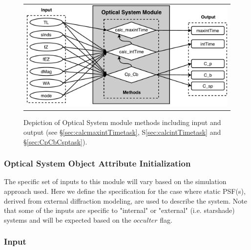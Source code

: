 \documentclass[cleanfoot]{asme2ej}
\begin{document}
\begin{figure}[ht]
    \begin{center}
        \begin{tabular}{c}
            \includegraphics[width=\textwidth]{OpticalSystem}
        \end{tabular}
    \end{center}
    \caption{\label{fig:opticalsysmodule} Depiction of Optical System module methods including input and output (see \S\ref{sec:calcmaxintTimetask}, S\ref{sec:calcintTimetask} and \S\ref{sec:CpCbCsptask}).}
\end{figure}

\label{sec:opticalsystem}
\subsubsection{Optical System Object Attribute Initialization} 

The specific set of inputs to this module will vary based on the simulation approach used.  Here we define the specification for the case where static PSF(s), derived from external diffraction modeling, are used to describe the system.  Note that some of the inputs are specific to "internal" or "external" (i.e. starshade) systems and will be expected based on the $occulter$ flag.

\subsubsection*{Input}
\end{document}
